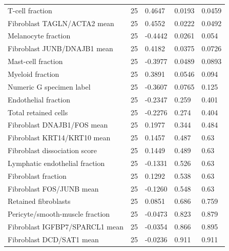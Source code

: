 {\begin{longtable}{@{}p{76mm}p{20mm}p{25mm}p{22mm}p{22mm}@{}}
T-cell fraction & 25 & 0.4647 & 0.0193 & 0.0459 \\
Fibroblast TAGLN/ACTA2 mean & 25 & 0.4552 & 0.0222 & 0.0492 \\
Melanocyte fraction & 25 & -0.4442 & 0.0261 & 0.054 \\
Fibroblast JUNB/DNAJB1 mean & 25 & 0.4182 & 0.0375 & 0.0726 \\
Mast-cell fraction & 25 & -0.3977 & 0.0489 & 0.0893 \\
Myeloid fraction & 25 & 0.3891 & 0.0546 & 0.094 \\
Numeric G specimen label & 25 & -0.3607 & 0.0765 & 0.125 \\
Endothelial fraction & 25 & -0.2347 & 0.259 & 0.401 \\
Total retained cells & 25 & -0.2276 & 0.274 & 0.404 \\
Fibroblast DNAJB1/FOS mean & 25 & 0.1977 & 0.344 & 0.484 \\
Fibroblast KRT14/KRT10 mean & 25 & 0.1457 & 0.487 & 0.63 \\
Fibroblast dissociation score & 25 & 0.1449 & 0.489 & 0.63 \\
Lymphatic endothelial fraction & 25 & -0.1331 & 0.526 & 0.63 \\
Fibroblast fraction & 25 & 0.1292 & 0.538 & 0.63 \\
Fibroblast FOS/JUNB mean & 25 & -0.1260 & 0.548 & 0.63 \\
Retained fibroblasts & 25 & 0.0851 & 0.686 & 0.759 \\
Pericyte/smooth-muscle fraction & 25 & -0.0473 & 0.823 & 0.879 \\
Fibroblast IGFBP7/SPARCL1 mean & 25 & -0.0354 & 0.866 & 0.895 \\
Fibroblast DCD/SAT1 mean & 25 & -0.0236 & 0.911 & 0.911 \\
\end{longtable}
}

